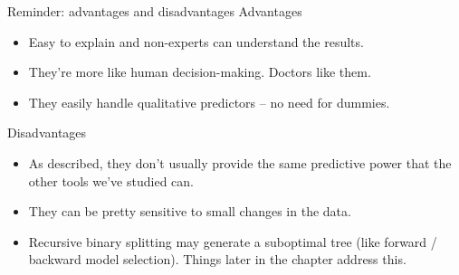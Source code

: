 \documentclass[mathserif, aspectratio=169]{beamer}
\begin{document}
\begin{frame}{Reminder: advantages and disadvantages}
Advantages

\begin{itemize}
\item Easy to explain and non-experts can understand the results.
\item They're more like human decision-making.  Doctors like them.
\item They easily handle qualitative predictors -- no need for dummies.
\end{itemize}

Disadvantages

\begin{itemize}
\item As described, they don't usually provide the same predictive power that the other tools we've studied can.
\item They can be pretty sensitive to small changes in the data. 
\item Recursive binary splitting may generate a suboptimal tree (like forward / backward model selection).  Things later in the chapter address this.
\end{itemize}
\end{frame}
\end{document}
